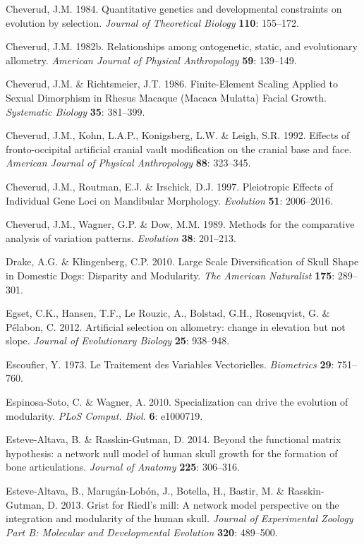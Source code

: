 \documentclass[12pt,twoside]{report}
\begin{document}
Cheverud, J.M. 1984. Quantitative genetics and developmental constraints
on evolution by selection. \emph{Journal of Theoretical Biology}
\textbf{110}: 155--172.

Cheverud, J.M. 1982b. Relationships among ontogenetic, static, and
evolutionary allometry. \emph{American Journal of Physical Anthropology}
\textbf{59}: 139--149.

Cheverud, J.M. \& Richtsmeier, J.T. 1986. Finite-Element Scaling Applied
to Sexual Dimorphism in Rhesus Macaque (Macaca Mulatta) Facial Growth.
\emph{Systematic Biology} \textbf{35}: 381--399.

Cheverud, J.M., Kohn, L.A.P., Konigsberg, L.W. \& Leigh, S.R. 1992.
Effects of fronto-occipital artificial cranial vault modification on the
cranial base and face. \emph{American Journal of Physical Anthropology}
\textbf{88}: 323--345.

Cheverud, J.M., Routman, E.J. \& Irschick, D.J. 1997. Pleiotropic
Effects of Individual Gene Loci on Mandibular Morphology.
\emph{Evolution} \textbf{51}: 2006--2016.

Cheverud, J.M., Wagner, G.P. \& Dow, M.M. 1989. Methods for the
comparative analysis of variation patterns. \emph{Evolution}
\textbf{38}: 201--213.

Drake, A.G. \& Klingenberg, C.P. 2010. Large Scale Diversification of
Skull Shape in Domestic Dogs: Disparity and Modularity. \emph{The
American Naturalist} \textbf{175}: 289--301.

Egset, C.K., Hansen, T.F., Le Rouzic, A., Bolstad, G.H., Rosenqvist, G.
\& Pélabon, C. 2012. Artificial selection on allometry: change in
elevation but not slope. \emph{Journal of Evolutionary Biology}
\textbf{25}: 938--948.

Escoufier, Y. 1973. Le Traitement des Variables Vectorielles.
\emph{Biometrics} \textbf{29}: 751--760.

Espinosa-Soto, C. \& Wagner, A. 2010. Specialization can drive the
evolution of modularity. \emph{PLoS Comput. Biol.} \textbf{6}: e1000719.

Esteve-Altava, B. \& Rasskin-Gutman, D. 2014. Beyond the functional
matrix hypothesis: a network null model of human skull growth for the
formation of bone articulations. \emph{Journal of Anatomy} \textbf{225}:
306--316.

Esteve-Altava, B., Marugán-Lobón, J., Botella, H., Bastir, M. \&
Rasskin-Gutman, D. 2013. Grist for Riedl's mill: A network model
perspective on the integration and modularity of the human skull.
\emph{Journal of Experimental Zoology Part B: Molecular and
Developmental Evolution} \textbf{320}: 489--500.
\end{document}
